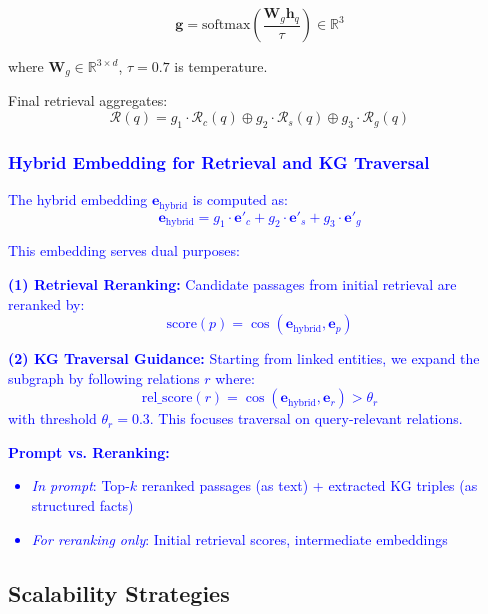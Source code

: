 \documentclass[10pt,twocolumn]{article}
\newcommand{\revision}[1]{\textcolor{blue}{#1}}
\begin{document}
\begin{equation}
\mathbf{g} = \text{softmax}\left( \frac{\mathbf{W}_g \mathbf{h}_q}{\tau} \right) \in \mathbb{R}^3
\end{equation}

where $\mathbf{W}_g \in \mathbb{R}^{3 \times d}$, $\tau=0.7$ is temperature.

Final retrieval aggregates:
\begin{equation}
\mathcal{R}(q) = g_1 \cdot \mathcal{R}_c(q) \oplus g_2 \cdot \mathcal{R}_s(q) \oplus g_3 \cdot \mathcal{R}_g(q)
\end{equation}

\revision{
\subsubsection{Hybrid Embedding for Retrieval and KG Traversal}

The hybrid embedding $\mathbf{e}_{\text{hybrid}}$ is computed as:
\begin{equation}
\mathbf{e}_{\text{hybrid}} = g_1 \cdot \mathbf{e}'_c + g_2 \cdot \mathbf{e}'_s + g_3 \cdot \mathbf{e}'_g
\end{equation}

This embedding serves dual purposes:

\textbf{(1) Retrieval Reranking:} Candidate passages from initial retrieval are reranked by:
\begin{equation}
\text{score}(p) = \cos(\mathbf{e}_{\text{hybrid}}, \mathbf{e}_p)
\end{equation}

\textbf{(2) KG Traversal Guidance:} Starting from linked entities, we expand the subgraph by following relations $r$ where:
\begin{equation}
\text{rel\_score}(r) = \cos(\mathbf{e}_{\text{hybrid}}, \mathbf{e}_r) > \theta_r
\end{equation}
with threshold $\theta_r = 0.3$. This focuses traversal on query-relevant relations.

\textbf{Prompt vs. Reranking:}
\begin{itemize}
    \item \textit{In prompt}: Top-$k$ reranked passages (as text) + extracted KG triples (as structured facts)
    \item \textit{For reranking only}: Initial retrieval scores, intermediate embeddings
\end{itemize}
}

\subsection{Scalability Strategies}
\label{sec:scale}
\end{document}
